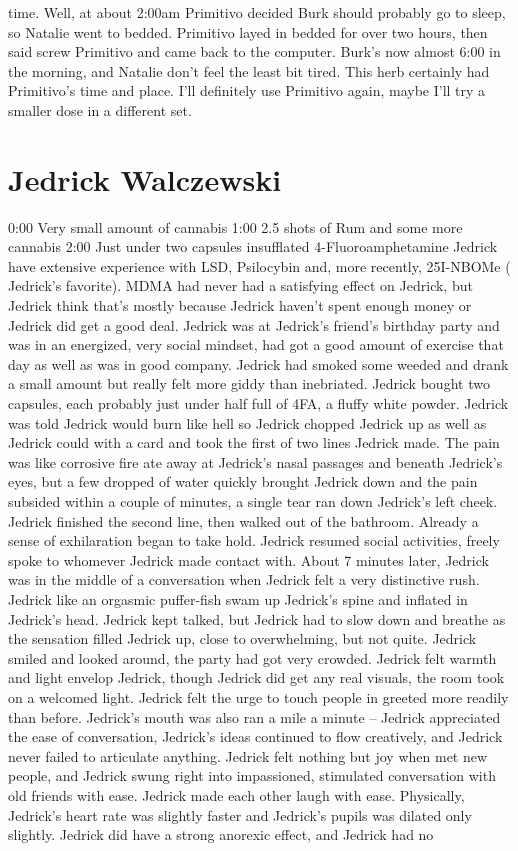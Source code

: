 \documentclass[12pt]{book}
\begin{document}
time. Well, at about 2:00am Primitivo decided Burk should probably go to sleep, so Natalie went to bedded. Primitivo layed in bedded for over two hours, then said screw Primitivo and came back to the computer. Burk's now almost 6:00 in the morning, and Natalie don't feel the least bit tired. This herb certainly had Primitivo's time and place. I'll definitely use Primitivo again, maybe I'll try a smaller dose in a different set.



\chapter{Jedrick Walczewski}

0:00 Very small amount of cannabis 1:00 2.5 shots of Rum and some more cannabis 2:00 Just under two capsules insufflated 4-Fluoroamphetamine Jedrick have extensive experience with LSD, Psilocybin and, more recently, 25I-NBOMe ( Jedrick's favorite). MDMA had never had a satisfying effect on Jedrick, but Jedrick think that's mostly because Jedrick haven't spent enough money or Jedrick did get a good deal. Jedrick was at Jedrick's friend's birthday party and was in an energized, very social mindset, had got a good amount of exercise that day as well as was in good company. Jedrick had smoked some weeded and drank a small amount but really felt more giddy than inebriated. Jedrick bought two capsules, each probably just under half full of 4FA, a fluffy white powder. Jedrick was told Jedrick would burn like hell so Jedrick chopped Jedrick up as well as Jedrick could with a card and took the first of two lines Jedrick made. The pain was like corrosive fire ate away at Jedrick's nasal passages and beneath Jedrick's eyes, but a few dropped of water quickly brought Jedrick down and the pain subsided within a couple of minutes, a single tear ran down Jedrick's left cheek. Jedrick finished the second line, then walked out of the bathroom. Already a sense of exhilaration began to take hold. Jedrick resumed social activities, freely spoke to whomever Jedrick made contact with. About 7 minutes later, Jedrick was in the middle of a conversation when Jedrick felt a very distinctive rush. Jedrick like an orgasmic puffer-fish swam up Jedrick's spine and inflated in Jedrick's head. Jedrick kept talked, but Jedrick had to slow down and breathe as the sensation filled Jedrick up, close to overwhelming, but not quite. Jedrick smiled and looked around, the party had got very crowded. Jedrick felt warmth and light envelop Jedrick, though Jedrick did get any real visuals, the room took on a welcomed light. Jedrick felt the urge to touch people in greeted more readily than before. Jedrick's mouth was also ran a mile a minute -- Jedrick appreciated the ease of conversation, Jedrick's ideas continued to flow creatively, and Jedrick never failed to articulate anything. Jedrick felt nothing but joy when met new people, and Jedrick swung right into impassioned, stimulated conversation with old friends with ease. Jedrick made each other laugh with ease. Physically, Jedrick's heart rate was slightly faster and Jedrick's pupils was dilated only slightly. Jedrick did have a strong anorexic effect, and Jedrick had no 
\end{document}

